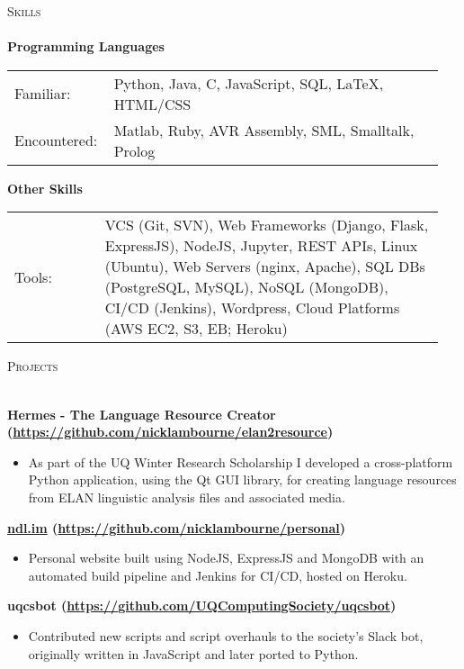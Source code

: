 \documentclass[a4paper]{article}
\newcommand{\lineunder} {
    \vspace*{-8pt} \\
    \hspace*{-10pt} \hrulefill \\
}
\newcommand{\header} [1] {
    {\hspace*{-10pt}\vspace*{6pt} \textsc{#1}}
    \vspace*{-6pt} \lineunder
}
\newenvironment{singleitem}
{   \small
    \vspace{-2.6pt}
    \begin{itemize}
    \setlength{\itemsep}{0pt}
    \setlength{\parskip}{0pt}
    \setlength{\parsep}{0pt}   }
{\end{itemize} \vspace{-2.6pt}	}
\begin{document}
\vspace{-1mm}
\header{Skills}
\textbf{Programming Languages}
\begin{tabular}{p{0.20\linewidth}p{0.75\linewidth}}
	\small Familiar: & \small Python, Java, C, JavaScript, SQL, \LaTeX, HTML/CSS \\
	\small Encountered: & \small Matlab, Ruby, AVR Assembly, SML, Smalltalk, Prolog\\
\end{tabular}
\textbf{Other Skills}
\begin{tabular}{p{0.20\linewidth}p{0.75\linewidth}}
	\small Tools: & \small VCS (Git, SVN), Web Frameworks (Django, Flask, ExpressJS), NodeJS,  Jupyter, REST APIs, Linux (Ubuntu), Web Servers (nginx, Apache), SQL DBs (PostgreSQL, MySQL), NoSQL (MongoDB), CI/CD (Jenkins), Wordpress, Cloud Platforms (AWS EC2, S3, EB; Heroku)
\end{tabular}

\vspace{1mm}

\header{Projects}
\vspace{1mm}

\textbf{{Hermes - The Language Resource Creator} (\href{https://github.com/nicklambourne/elan2resource}{https://github.com/nicklambourne/elan2resource})}
\begin{singleitem}
	\item As part of the UQ Winter Research Scholarship I developed a cross-platform Python application, using the Qt GUI library, for creating language resources from ELAN linguistic analysis files and associated media.
\end{singleitem}

\textbf{\href{https://ndl.im}{ndl.im} (\href{https://github.com/nicklambourne/personal}{https://github.com/nicklambourne/personal})}
\begin{singleitem}
	\item Personal website built using NodeJS, ExpressJS and MongoDB with an automated build pipeline and Jenkins for CI/CD, hosted on Heroku.
\end{singleitem}

\textbf{uqcsbot (\href{https://github.com/UQComputingSociety/uqcsbot}{https://github.com/UQComputingSociety/uqcsbot})}
\begin{singleitem}
	\item Contributed new scripts and script overhauls to the society's Slack bot, originally written in JavaScript and later ported to Python.
\end{singleitem}
\end{document}
